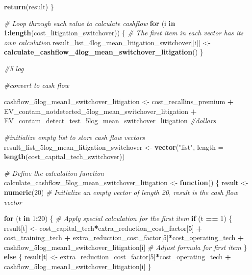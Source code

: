 \documentclass[
]{article}
\newenvironment{Shaded}{\begin{snugshade}}{\end{snugshade}}
\newcommand{\AttributeTok}[1]{\textcolor[rgb]{0.13,0.29,0.53}{#1}}
\newcommand{\CommentTok}[1]{\textcolor[rgb]{0.56,0.35,0.01}{\textit{#1}}}
\newcommand{\ControlFlowTok}[1]{\textcolor[rgb]{0.13,0.29,0.53}{\textbf{#1}}}
\newcommand{\DecValTok}[1]{\textcolor[rgb]{0.00,0.00,0.81}{#1}}
\newcommand{\FunctionTok}[1]{\textcolor[rgb]{0.13,0.29,0.53}{\textbf{#1}}}
\newcommand{\NormalTok}[1]{#1}
\newcommand{\OtherTok}[1]{\textcolor[rgb]{0.56,0.35,0.01}{#1}}
\newcommand{\SpecialCharTok}[1]{\textcolor[rgb]{0.81,0.36,0.00}{\textbf{#1}}}
\newcommand{\StringTok}[1]{\textcolor[rgb]{0.31,0.60,0.02}{#1}}
\begin{document}
\begin{Shaded}
\begin{Highlighting}[]
  \FunctionTok{return}\NormalTok{(result)}
\NormalTok{\}}

\CommentTok{\# Loop through each value to calculate cashflow}
\ControlFlowTok{for}\NormalTok{ (i }\ControlFlowTok{in} \DecValTok{1}\SpecialCharTok{:}\FunctionTok{length}\NormalTok{(cost\_litigation\_switchover)) \{}
  \CommentTok{\# The first item in each vector has its own calculation}
\NormalTok{  result\_list\_4log\_mean\_litigation\_switchover[[i]] }\OtherTok{\textless{}{-}} \FunctionTok{calculate\_cashflow\_4log\_mean\_switchover\_litigation}\NormalTok{()}
\NormalTok{\}}



\CommentTok{\#5 log }

\CommentTok{\#convert to cash flow}

\NormalTok{cashflow\_5log\_mean1\_switchover\_litigation }\OtherTok{\textless{}{-}}\NormalTok{ cost\_recallins\_premium }\SpecialCharTok{+}\NormalTok{ EV\_contam\_notdetected\_5log\_mean\_switchover\_litigation }\SpecialCharTok{+}\NormalTok{ EV\_contam\_detect\_test\_5log\_mean\_switchover\_litigation }\CommentTok{\#dollars}


\CommentTok{\#initialize empty list to store cash flow vectors}
\NormalTok{result\_list\_5log\_mean\_litigation\_switchover }\OtherTok{\textless{}{-}} \FunctionTok{vector}\NormalTok{(}\StringTok{"list"}\NormalTok{, }\AttributeTok{length =} \FunctionTok{length}\NormalTok{(cost\_capital\_tech\_switchover))}


\CommentTok{\# Define the calculation function}
\NormalTok{calculate\_cashflow\_5log\_mean\_switchover\_litigation }\OtherTok{\textless{}{-}} \ControlFlowTok{function}\NormalTok{() \{}
\NormalTok{  result }\OtherTok{\textless{}{-}} \FunctionTok{numeric}\NormalTok{(}\DecValTok{20}\NormalTok{)  }\CommentTok{\# Initialize an empty vector of length 20, result is the cash flow vector}
  
  \ControlFlowTok{for}\NormalTok{ (t }\ControlFlowTok{in} \DecValTok{1}\SpecialCharTok{:}\DecValTok{20}\NormalTok{) \{}
    \CommentTok{\# Apply special calculation for the first item}
    \ControlFlowTok{if}\NormalTok{ (t }\SpecialCharTok{==} \DecValTok{1}\NormalTok{) \{}
\NormalTok{      result[t] }\OtherTok{\textless{}{-}}\NormalTok{ cost\_capital\_tech}\SpecialCharTok{*}\NormalTok{extra\_reduction\_cost\_factor[}\DecValTok{5}\NormalTok{] }\SpecialCharTok{+}\NormalTok{ cost\_training\_tech }\SpecialCharTok{+}\NormalTok{ extra\_reduction\_cost\_factor[}\DecValTok{5}\NormalTok{]}\SpecialCharTok{*}\NormalTok{cost\_operating\_tech }\SpecialCharTok{+}\NormalTok{ cashflow\_5log\_mean1\_switchover\_litigation[i] }\CommentTok{\# Adjust formula for first item}
\NormalTok{    \} }\ControlFlowTok{else}\NormalTok{ \{}
\NormalTok{      result[t] }\OtherTok{\textless{}{-}}\NormalTok{ extra\_reduction\_cost\_factor[}\DecValTok{5}\NormalTok{]}\SpecialCharTok{*}\NormalTok{cost\_operating\_tech }\SpecialCharTok{+}\NormalTok{ cashflow\_5log\_mean1\_switchover\_litigation[i]}
\NormalTok{    \}}
    

\end{Highlighting}
\end{Shaded}
\end{document}
